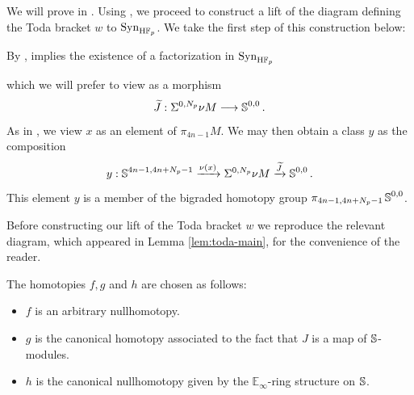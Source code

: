 We will prove  in .
Using , we proceed to construct a lift of the diagram defining the Toda bracket $w$ to $\mathrm{Syn}_{\mathrm{H}\mathbb{F}_p}$.
We take the first step of this construction below:

\begin{cnstr}
By ,  implies the existence of a factorization in $\mathrm{Syn}_{\mathrm{H}\mathbb{F}_p}$
\begin{center}
\end{center}
which we will prefer to view as a morphism
$$\wt{J}:\Sigma^{0,N_p}\nu M \longrightarrow \Ss^{0,0}.$$
As in , we view $x$ as an element of $\pi_{4n-1} M$.
We may then obtain a class $y$ as the composition
$$ y:\Ss^{4n-1,4n+N_p-1} \xrightarrow{\nu(x)} \Sigma^{0,N_p} \nu M \xrightarrow{\wt{J}} \Ss^{0,0}. $$
This element $y$ is a member of the bigraded homotopy group $\pi_{4n-1,4n+N_p-1}\operatorname{\mathbb{S}}^{0,0}$.
\end{cnstr}

Before constructing our lift of the Toda bracket $w$ we reproduce the relevant diagram, which appeared in Lemma \ref{lem:toda-main}, for the convenience of the reader.
\begin{center}
\end{center}
The homotopies $f,g$ and $h$ are chosen as follows:
\begin{itemize}
\item $f$ is an arbitrary nullhomotopy.
\item $g$ is the canonical homotopy associated to the fact that $J$ is a map of $\operatorname{\mathbb{S}}$-modules.
\item $h$ is the canonical nullhomotopy given by the $\mathbb{E}_\infty$-ring structure on $\operatorname{\mathbb{S}}$.
\end{itemize}

